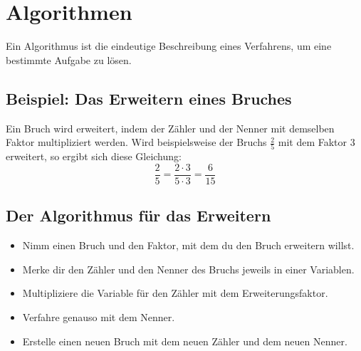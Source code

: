 \section{Algorithmen}
\label{sec:Algorithmus}

Ein Algorithmus ist die eindeutige Beschreibung eines Verfahrens, um eine bestimmte Aufgabe zu lösen.

\subsection{Beispiel: Das Erweitern eines Bruches}

Ein Bruch wird erweitert, indem der Zähler und der Nenner mit demselben Faktor multipliziert werden. Wird beispielsweise der Bruchs $\frac{2}{5}$ mit dem Faktor $3$ erweitert, so ergibt sich diese Gleichung:
\[
\frac{2}{5} = \frac{2 \cdot 3}{5 \cdot 3} = \frac{6}{15}
\]

\subsection{Der Algorithmus für das Erweitern}

\begin{itemize}
	\item Nimm einen Bruch und den Faktor, mit dem du den Bruch erweitern willst.
	\item Merke dir den Zähler und den Nenner des Bruchs jeweils in einer Variablen.
	\item Multipliziere die Variable für den Zähler mit dem Erweiterungsfaktor.
	\item Verfahre genauso mit dem Nenner.
	\item Erstelle einen neuen Bruch mit dem neuen Zähler und dem neuen Nenner.
\end{itemize}